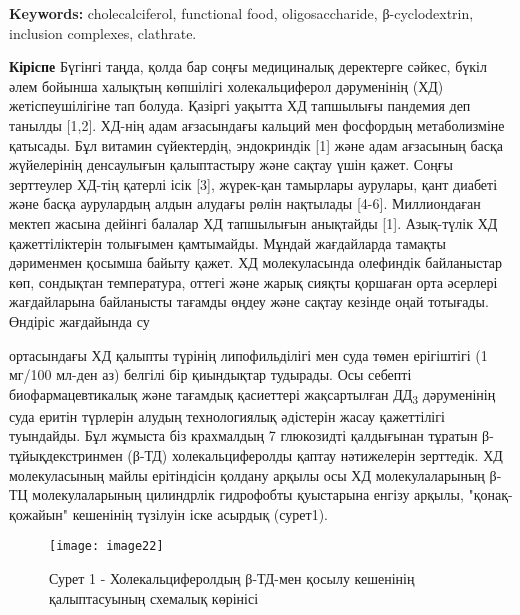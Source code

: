 {\bfseries Keywords:} cholecalciferol, functional food, oligosaccharide,
β-cyclodextrin, inclusion complexes, clathrate.

\begin{multicols}{2}
{\bfseries Кіріспе} Бүгінгі таңда, қолда бар соңғы медициналық деректерге
сәйкес, бүкіл әлем бойынша халықтың көпшілігі холекальциферол
дәруменінің (ХД) жетіспеушілігіне тап болуда. Қазіргі уақытта ХД
тапшылығы пандемия деп танылды {[}1,2{]}. ХД-нің адам ағзасындағы
кальций мен фосфордың метаболизміне қатысады. Бұл витамин сүйектердің,
эндокриндік {[}1{]} және адам ағзасының басқа жүйелерінің денсаулығын
қалыптастыру және сақтау үшін қажет. Соңғы зерттеулер ХД-тің қатерлі
ісік {[}3{]}, жүрек-қан тамырлары аурулары, қант диабеті және басқа
аурулардың алдын алудағы рөлін нақтылады {[}4-6{]}. Миллиондаған мектеп
жасына дейінгі балалар ХД тапшылығын анықтайды {[}1{]}. Азық-түлік ХД
қажеттіліктерін толығымен қамтымайды. Мұндай жағдайларда тамақты
дәрименмен қосымша байыту қажет. ХД молекуласында олефиндік байланыстар
көп, сондықтан температура, оттегі және жарық сияқты қоршаған орта
әсерлері жағдайларына байланысты тағамды өңдеу және сақтау кезінде оңай
тотығады. Өндіріс жағдайында су

ортасындағы ХД қалыпты түрінің липофильділігі мен суда төмен ерігіштігі
(1 мг/100 мл-ден аз) белгілі бір қиындықтар тудырады. Осы себепті
биофармацевтикалық және тағамдық қасиеттері жақсартылған
ДД\textsubscript{3} дәруменінің суда еритін түрлерін алудың
технологиялық әдістерін жасау қажеттілігі туындайды. Бұл жұмыста біз
крахмалдың 7 глюкозидті қалдығынан тұратын β-тұйықдекстринмен (β-ТД)
холекальциферолды қаптау нәтижелерін зерттедік. ХД молекуласының майлы
ерітіндісін қолдану арқылы осы ХД молекулаларының β-ТЦ молекулаларының
цилиндрлік гидрофобты қуыстарына енгізу арқылы, "қонақ-қожайын"
кешенінің түзілуін іске асырдық (сурет1).
\end{multicols}

\begin{figure}[H]
  \centering
  \texttt{[image: image22]}
  \caption*{Сурет 1 - Холекальциферолдың β-ТД-мен қосылу кешенінің қалыптасуының схемалық көрінісі}
\end{figure}

